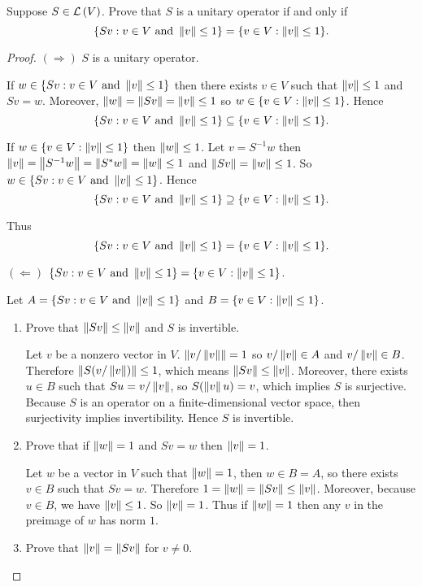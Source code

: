 \begin{exercise}
    Suppose $S\in\mathcal{L}\left({V}\right)$. Prove that $S$ is a unitary operator if and only if
    \[
        \{ Sv : v\in V \text{ and } \left\Vert{v}\right\Vert\leq 1 \} = \{ v\in V: \left\Vert{v}\right\Vert\leq 1 \}.
    \]
\end{exercise}

\begin{proof}
    $(\Rightarrow)$ $S$ is a unitary operator.

    If $w\in \{ Sv : v\in V \text{ and } \left\Vert{v}\right\Vert\leq 1 \}$ then there exists $v\in V$ such that $\left\Vert{v}\right\Vert\leq 1$ and $Sv = w$. Moreover, $\left\Vert{w}\right\Vert = \left\Vert{Sv}\right\Vert = \left\Vert{v}\right\Vert\leq 1$ so $w\in \{ v\in V: \left\Vert{v}\right\Vert\leq 1 \}$. Hence
    \[
        \{ Sv : v\in V \text{ and } \left\Vert{v}\right\Vert\leq 1 \} \subseteq \{ v\in V: \left\Vert{v}\right\Vert\leq 1 \}.
    \]

    If $w\in \{ v\in V: \left\Vert{v}\right\Vert\leq 1 \}$ then $\left\Vert{w}\right\Vert\leq 1$. Let $v = S^{-1}w$ then $\left\Vert{v}\right\Vert = \left\Vert{S^{-1}w}\right\Vert = \left\Vert{S^{*}w}\right\Vert = \left\Vert{w}\right\Vert\leq 1$ and $\left\Vert{Sv}\right\Vert = \left\Vert{w}\right\Vert\leq 1$. So $w\in \{ Sv : v\in V \text{ and } \left\Vert{v}\right\Vert\leq 1 \}$. Hence
    \[
        \{ Sv : v\in V \text{ and } \left\Vert{v}\right\Vert\leq 1 \} \supseteq \{ v\in V: \left\Vert{v}\right\Vert\leq 1 \}.
    \]

    Thus
    \[
        \{ Sv : v\in V \text{ and } \left\Vert{v}\right\Vert\leq 1 \} = \{ v\in V: \left\Vert{v}\right\Vert\leq 1 \}.
    \]

    \bigskip
    $(\Leftarrow)$ $\{ Sv : v\in V \text{ and } \left\Vert{v}\right\Vert\leq 1 \} = \{ v\in V: \left\Vert{v}\right\Vert\leq 1 \}$.

    Let $A = \{ Sv : v\in V \text{ and } \left\Vert{v}\right\Vert\leq 1 \}$ and $B = \{ v\in V: \left\Vert{v}\right\Vert\leq 1 \}$.

    \begin{enumerate}[label={(\roman*)}]
        \item Prove that $\left\Vert{Sv}\right\Vert\leq\left\Vert{v}\right\Vert$ and $S$ is invertible.

              Let $v$ be a nonzero vector in $V$. $\left\Vert{v/\left\Vert{v}\right\Vert}\right\Vert = 1$ so $v/\left\Vert{v}\right\Vert\in A$ and $v/\left\Vert{v}\right\Vert\in B$. Therefore $\left\Vert{S(v/\left\Vert{v}\right\Vert)}\right\Vert\leq 1$, which means $\left\Vert{Sv}\right\Vert\leq\left\Vert{v}\right\Vert$. Moreover, there exists $u\in B$ such that $Su = v/\left\Vert{v}\right\Vert$, so $S(\left\Vert{v}\right\Vert u) = v$, which implies $S$ is surjective. Because $S$ is an operator on a finite-dimensional vector space, then surjectivity implies invertibility. Hence $S$ is invertible.
        \item Prove that if $\left\Vert{w}\right\Vert = 1$ and $Sv = w$ then $\left\Vert{v}\right\Vert = 1$.

              Let $w$ be a vector in $V$ such that $\left\Vert{w}\right\Vert = 1$, then $w\in B = A$, so there exists $v\in B$ such that $Sv = w$. Therefore $1 = \left\Vert{w}\right\Vert = \left\Vert{Sv}\right\Vert\leq \left\Vert{v}\right\Vert$. Moreover, because $v\in B$, we have $\left\Vert{v}\right\Vert\leq 1$. So $\left\Vert{v}\right\Vert = 1$. Thus if $\left\Vert{w}\right\Vert = 1$ then any $v$ in the preimage of $w$ has norm $1$.
        \item Prove that $\left\Vert{v}\right\Vert = \left\Vert{Sv}\right\Vert$ for $v\ne 0$.


\end{enumerate}
\end{proof}

